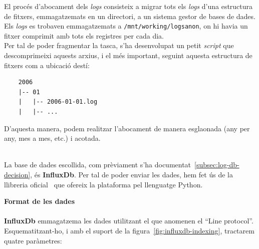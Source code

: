 \noindent
El procés d’abocament dels \textit{\gls{log}s} consisteix a migrar tots els \textit{\gls{log}s} d’una estructura de fitxers, emmagatzemats en un directori, a un sistema gestor de bases de dades. \\

\noindent
Els \textit{\gls{log}s} es trobaven emmagatzemats a \texttt{/mnt/working/logsanon}, on hi havia un fitxer comprimit amb tots els registres per cada dia. \\

\noindent
Per tal de poder fragmentar la tasca, s’ha desenvolupat un petit \textit{script} que descomprimeixi aquests arxius, i el més important, seguint aquesta estructura de fitxers com a ubicació destí:

\begin{verbatim}
    2006
    |-- 01
    |   |-- 2006-01-01.log
    |   |-- ...
\end{verbatim}
\noindent
D’aquesta manera, podem realitzar l’abocament de manera esglaonada (any per any, mes a mes, etc.) i acotada.

\noindent \\
La base de dades escollida, com prèviament s’ha documentat~\ref{subsec:log-db-decision}, és \textbf{InfluxDb}.
Per tal de poder enviar les dades, hem fet ús de la llibreria oficial~\cite{influxdb:python} que ofereix la plataforma pel llenguatge Python.

\clearpage

\noindent
\textbf{Format de les dades} \\ \\
\textbf{InfluxDb} emmagatzema les dades utilitzant el que anomenen el ``Line protocol''.
Esquematitzant-ho, i amb el suport de la figura~\ref{fig:influxdb-indexing}, tractarem quatre paràmetres:


